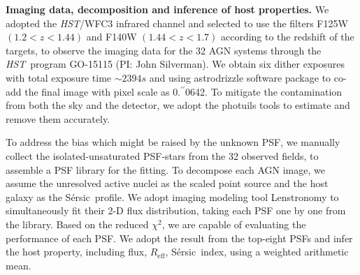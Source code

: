 \documentclass{natureprintstyle}
\newcommand{\hst}{{\it HST}}
\newcommand{\mbh}{$\mathcal M_{\rm BH}$}
\newcommand{\halpha}{${\it H}\alpha$}
\newcommand{\hbeta}{${\it H}\beta$}
\newcommand{\sersic}{S\'ersic}
\newcommand{\lenstronomy}{{\sc Lenstronomy}}
\newcommand{\reff}{{$R_{\mathrm{eff}}$}}
\newcommand{\Mgii}{Mg$_{\rm II}$}
\newcommand{\Civ}{C$_{\rm IV}$}
\newcommand{\farcs}{\mbox{\ensuremath{.\!\!^{\prime\prime}}}}%
\begin{document}

\textbf{Imaging data, decomposition and inference of host properties.} 
We adopted the \hst/WFC3 infrared channel and selected to use the filters F125W $(1.2<z<1.44)$ and F140W $(1.44<z<1.7)$ according to the redshift of the targets, to observe the imaging data for the 32 AGN systems through the \hst\ program GO-15115 (PI: John Silverman). We obtain six dither exposures with total exposure time $\sim2394s$ and using  {\sc astrodrizzle} software package to co-add the final image with pixel scale as 0\farcs0642. To mitigate the contamination from both the sky and the detector, we adopt the {\sc photuils} tools to estimate and remove them accurately.

To address the bias which might be raised by the unknown PSF, we manually collect the isolated-unsaturated PSF-stars from the 32 observed fields, to assemble a PSF library for the fitting. To decompose each AGN image, we assume the unresolved active nuclei as the scaled point source and the host galaxy as the \sersic\ profile. We adopt imaging modeling tool \lenstronomy\cite{lenstronomy} to simultaneously fit their 2-D flux distribution, taking each PSF one by one from the library. Based on the reduced $\chi^2$, we are capable of evaluating the performance of each PSF. We adopt the result from the top-eight PSFs and infer the host property, including flux, \reff, \sersic\ index, using a weighted arithmetic mean.
\end{document}
